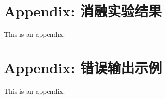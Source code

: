 \documentclass[11pt]{article}
\begin{document}


%



\clearpage
\appendix

\section{Appendix: 消融实验结果}
\label{sec:appendixA}
This is an appendix.

\section{Appendix: 错误输出示例}
\label{sec:appendixB}
This is an appendix.
\end{document}

